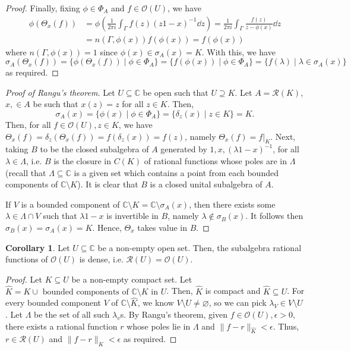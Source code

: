 \documentclass[]{article}
\theoremstyle{definition}
\newtheorem{corollary}{Corollary}[theorem]
\begin{document}
\begin{proof}
  Finally, fixing \(\phi \in \Phi_A\) and \(f \in \mathcal{O}(U)\), we have
  \begin{align*}
    \phi(\Theta_x(f)) & = \phi \left(\frac{1}{2\pi i}\int_\Gamma f(z)(z1 - x)^{-1} \dd z\right) 
        = \frac{1}{2\pi i} \int_\Gamma \frac{f(z)}{z - \phi(x)} \dd z\\
      & = n(\Gamma, \phi(x)) f(\phi(x)) = f(\phi(x))
  \end{align*}
  where \(n(\Gamma, \phi(x)) = 1\) since \(\phi(x) \in \sigma_A(x) = K\). With this, we have
  \[\sigma_A(\Theta_x(f)) = \{\phi(\Theta_x(f)) \mid \phi \in \Phi_A\}
    = \{f(\phi(x)) \mid \phi \in \Phi_A\} = \{f(\lambda) \mid \lambda \in \sigma_A(x)\}\]
  as required.
\end{proof}

\begin{proof}[Proof of Rangu's theorem]
  Let \(U \subseteq \mathbb{C}\) be open such that \(U \supseteq K\). Let \(A = \mathcal{R}(K)\), 
  \(x, \in A\) be such that \(x(z) = z\) for all \(z \in K\). Then, 
  \[\sigma_A(x) = \{\phi(x) \mid \phi \in \Phi_A\} = \{\delta_z(x) \mid z \in K\} = K.\]
  Then, for all \(f \in \mathcal{O}(U), z \in K\), we have 
  \(\Theta_x(f) = \delta_z(\Theta_x(f)) = f(\delta_z(x)) = f(z)\), namely \(\Theta_x(f) = f|_K\). 
  Next, taking \(B\) to be the closed subalgebra of \(A\) generated by \(1, x, (\lambda 1 - x)^{-1}\), 
  for all \(\lambda \in \Lambda\), i.e. \(B\) is the 
  closure in \(C(K)\) of rational functions whose poles are in \(\Lambda\) 
  (recall that \(\Lambda \subseteq \mathbb{C}\) is a given set which 
  contains a point from each bounded components of \(\mathbb{C} \setminus K\)). It is clear that 
  \(B\) is a closed unital subalgebra of \(A\). 

  If \(V\) is a bounded component of \(\mathbb{C} \setminus K = \mathbb{C} \setminus \sigma_A(x)\), 
  then there exists some \(\lambda \in \Lambda \cap V\) such that \(\lambda 1 - x\) is invertible in 
  \(B\), namely \(\lambda \not\in \sigma_B(x)\). It follows then \(\sigma_B(x) = \sigma_A(x) = K\). 
  Hence, \(\Theta_x\) takes value in \(B\). 
\end{proof}

\begin{corollary}
  Let \(U \subseteq \mathbb{C}\) be a non-empty open set. Then, the subalgebra rational functions of 
  \(\mathcal{O}(U)\) is dense, i.e. \(\mathcal{R}(U) = \mathcal{O}(U)\).
\end{corollary}
\begin{proof}
  Let \(K \subseteq U\) be a non-empty compact set. Let \(\hat K = K \cup \text{ bounded components 
  of } \mathbb{C} \setminus K \text{ in } U\). Then, \(\hat K\) is compact and \(\hat K \subseteq U\). 
  For every bounded component \(V\) of \(\mathbb{C} \setminus \hat K\), we know 
  \(V \setminus U \neq \varnothing\), so we can pick \(\lambda_V \in V \setminus U\). Let \(\Lambda\) 
  be the set of all such \(\lambda_v\)s. By Rangu's theorem, given \(f \in \mathcal{O}(U), \epsilon > 0\),
  there exists a rational function \(r\) whose poles lie in \(\Lambda\) and \(\|f - r\|_{\hat K} < \epsilon\).
  Thus, \(r \in \mathcal{R}(U)\) and \(\|f - r\|_K < \epsilon\) as required.
\end{proof}
\end{document}
